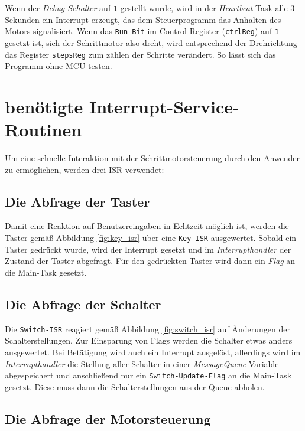 \documentclass[ngerman,fontsize=12pt , paper=a4 , twoside=false , DIV12 , BCOR=1cm ,
numbers=enddot , listof=totoc , bibliography=totoc , index=totoc ,
headings=small , headlines=1.5 , final]{scrbook}
\begin{document}
Wenn der \emph{Debug-Schalter} auf \lstinline!1! gestellt wurde, wird in
der \emph{Heartbeat}-Task alle 3 Sekunden ein Interrupt erzeugt, das dem
Steuerprogramm das Anhalten des Motors signalisiert. Wenn das
\lstinline!Run-Bit! im Control-Register (\lstinline!ctrlReg!) auf
\lstinline!1! gesetzt ist, sich der Schrittmotor also dreht, wird
entsprechend der Drehrichtung das Register \lstinline!stepsReg! zum
zählen der Schritte verändert. So lässt sich das Programm ohne MCU
testen.

\section{benötigte
Interrupt-Service-Routinen}\label{benuxf6tigte-interrupt-service-routinen}

Um eine schnelle Interaktion mit der Schrittmotorsteuerung durch den
Anwender zu ermöglichen, werden drei ISR verwendet:

\subsection{Die Abfrage der Taster}\label{die-abfrage-der-taster}

Damit eine Reaktion auf Benutzereingaben in Echtzeit möglich ist, werden
die Taster gemäß Abbildung \ref{fig:key_isr} über eine
\lstinline!Key-ISR! ausgewertet. Sobald ein Taster gedrückt wurde, wird
der Interrupt gesetzt und im \emph{Interrupthandler} der Zustand der
Taster abgefragt. Für den gedrückten Taster wird dann ein \emph{Flag} an
die Main-Task gesetzt.

\subsection{Die Abfrage der Schalter}\label{die-abfrage-der-schalter}

Die \lstinline!Switch-ISR! reagiert gemäß Abbildung \ref{fig:switch_isr}
auf Änderungen der Schalterstellungen. Zur Einsparung von Flags werden
die Schalter etwas anders ausgewertet. Bei Betätigung wird auch ein
Interrupt ausgelöst, allerdings wird im \emph{Interrupthandler} die
Stellung aller Schalter in einer \emph{MessageQueue}-Variable
abgespeichert und anschließend nur ein \lstinline!Switch-Update-Flag! an
die Main-Task gesetzt. Diese muss dann die Schalterstellungen aus der
Queue abholen.

\subsection{Die Abfrage der
Motorsteuerung}\label{die-abfrage-der-motorsteuerung}
\end{document}
